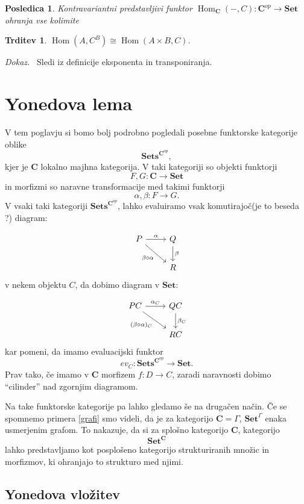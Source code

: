 \documentclass[12pt,a4paper]{book}
\theoremstyle{definition}
\theoremstyle{plain}
\newtheorem{trditev}[definicija]{Trditev}
\newtheorem{posledica}{Posledica}[definicija]
\newenvironment{dokaz}{\emph{Dokaz.}\ }{\hspace{\fill}{$\Box$}}
\theoremstyle{definition}
\theoremstyle{remark}
\newcommand{\cat}[1]{\textbf{#1}}
\DeclareMathOperator{\Hom}{Hom}
\newcommand{\predsnop}[1]{\cat{Sets}^{\cat{#1}^{op}}}
\begin{document}
\begin{posledica}
Kontravariantni predstavljivi funktor $\Hom_\cat{C}(-,C) : \cat{C}^{op} \to \cat{Set}$ ohranja vse kolimite
\end{posledica}

\begin{trditev}
$\Hom(A, C^B) \cong \Hom(A \times B, C).$
\end{trditev}
\begin{dokaz}
Sledi iz definicije eksponenta in transponiranja.
\end{dokaz}


\chapter{Yonedova lema}

V tem poglavju si bomo bolj podrobno pogledali posebne funktorske kategorije oblike
$$\predsnop{C},$$
kjer je $\cat{C}$ lokalno majhna kategorija. V taki kategoriji so objekti funktorji 
$$F,G : \cat{C} \to \cat{Set}$$
in morfizmi so naravne transformacije med takimi funktorji
$$\alpha, \beta : F \to G.$$ 
V vsaki taki kategoriji $\predsnop{C}$, lahko evaluiramo vsak komutirajoč(je to beseda ?) diagram:

$$
\begin{tikzcd}
P \ar[r, "\alpha"] \ar[rd, "\beta \circ \alpha"'] & Q \ar[d, "\beta"] \\
& R
\end{tikzcd}
$$
v nekem objektu $C$, da dobimo diagram v $\cat{Set}$:

$$
\begin{tikzcd}
PC \ar[r, "\alpha_C"] \ar[rd, "(\beta \circ \alpha)_C"'] & QC \ar[d, "\beta_C"] \\
& RC
\end{tikzcd}
$$
kar pomeni, da imamo evaluacijski funktor
$$ev_C : \predsnop{C} \to \cat{Set}.$$
Prav tako, če imamo v $\cat{C}$ morfizem $f : D \to C$, zaradi naravnosti dobimo "`cilinder"' nad zgornjim diagramom.


Na take funktorske kategorije pa lahko gledamo še na drugačen način.
Če se spomnemo primera \ref{grafi} smo videli, da je za kategorijo $\cat{C} = \Gamma$, $\cat{Set}^\Gamma$ enaka usmerjenim grafom. To nakazuje, da si za splošno kategorijo $\cat{C}$, kategorijo
$$\cat{Set}^\cat{C}$$
lahko predstavljamo kot posplošeno kategorijo strukturiranih množic in morfizmov, ki ohranjajo to strukturo med njimi.


\section{Yonedova vložitev}
\end{document}
